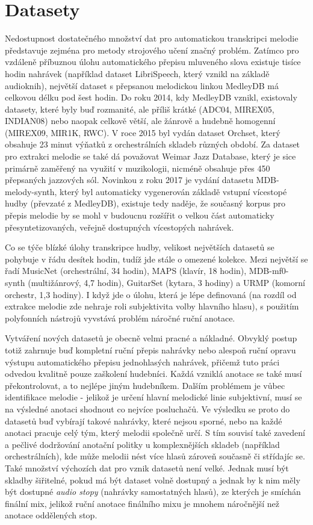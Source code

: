 \chapter{Datasety}\label{cha:datasety}

Nedostupnost dostatečného množství dat pro automatickou transkripci melodie představuje zejména pro metody strojového učení značný problém. Zatímco pro vzdáleně příbuznou úlohu automatického přepisu mluveného slova existuje tisíce hodin nahrávek (například dataset LibriSpeech, který vznikl na základě audioknih), největší dataset s přepsanou melodickou linkou MedleyDB má celkovou délku pod šest hodin. Do roku 2014, kdy MedleyDB vznikl, existovaly datasety, které byly buď rozmanité, ale příliš krátké (ADC04, MIREX05, INDIAN08) nebo naopak celkově větší, ale žánrově a hudebně homogenní (MIREX09, MIR1K, RWC). V roce 2015 byl vydán dataset Orchset, který obsahuje 23 minut výňatků z orchestrálních skladeb různých období. Za dataset pro extrakci melodie se také dá považovat Weimar Jazz Database, který je sice primárně zaměřený na využití v muzikologii, nicméně obsahuje přes 450 přepsaných jazzových sól. Novinkou z roku 2017 je vydání datasetu MDB-melody-synth, který byl automaticky vygenerován základě vstupní vícestopé hudby (převzaté z MedleyDB), existuje tedy naděje, že současný korpus pro přepis melodie by se mohl v budoucnu rozšířit o velkou část automaticky přesyntetizovaných, veřejně dostupných vícestopých nahrávek.

Co se týče blízké úlohy transkripce hudby, velikost největších datasetů se pohybuje v řádu desítek hodin, tudíž jde stále o omezené kolekce. Mezi největší se řadí MusicNet (orchestrální, 34 hodin), MAPS (klavír, 18 hodin), MDB-mf0-synth (multižánrový, 4,7 hodin), GuitarSet (kytara, 3 hodiny) a URMP (komorní orchestr, 1,3 hodiny). I když jde o úlohu, která je lépe definovaná (na rozdíl od extrakce melodie zde nehraje roli subjektivita volby hlavního hlasu), s použitím polyfonních nástrojů vyvstává problém náročné ruční anotace.

Vytváření nových datasetů je obecně velmi pracné a nákladné. Obvyklý postup totiž zahrnuje buď kompletní ruční přepis nahrávky nebo alespoň ruční opravu výstupu automatického přepisu jednohlasých nahrávek, přičemž tuto práci odvedou kvalitně pouze zaškolení hudebníci. Každá vzniklá anotace se také musí překontrolovat, a to nejlépe jiným hudebníkem. Dalším problémem je vůbec identifikace melodie - jelikož je určení hlavní melodické linie subjektivní, musí se na výsledné anotaci shodnout co nejvíce posluchačů. Ve výsledku se proto do datasetů buď vybírají takové nahrávky, které nejsou sporné, nebo na každé anotaci pracuje celý tým, který melodii společně určí. S tím souvisí také zavedení a pečlivé dodržování anotační politky u komplexnějších skladeb (například orchestrálních), kde může melodii nést více hlasů zároveň současně či střídajíc se. Také množství výchozích dat pro vznik datasetů není velké. Jednak musí být skladby šiřitelné, pokud má být dataset volně dostupný a jednak by k nim měly být dostupné \emph{audio stopy} (nahrávky samostatných hlasů), ze kterých je smíchán finální mix, jelikož ruční anotace finálního mixu je mnohem náročnější než anotace oddělených stop.

